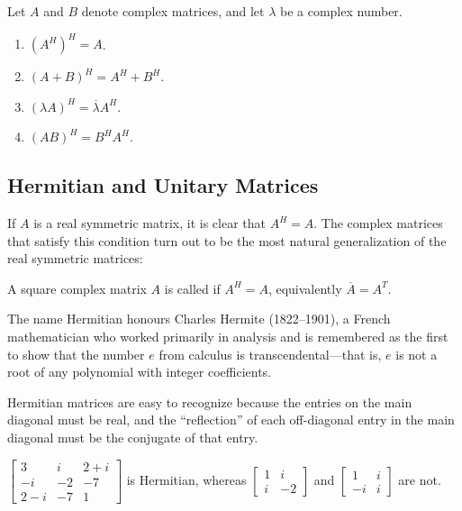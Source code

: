 \documentclass{ximera}
\begin{document}
\begin{theorem}\label{th:025659}
Let $A$ and $B$ denote complex matrices, and let $\lambda$ be a complex number.

\begin{enumerate}
\item\label{th:025659a} $(A^{H})^{H} = A$.

\item\label{th:025659b} $(A + B)^{H} = A^{H} + B^{H}$.

\item\label{th:025659c} $(\lambda A)^H = \overline{\lambda}A^H$.

\item\label{th:025659d} $(AB)^{H} = B^{H}A^{H}$.

\end{enumerate}
\end{theorem}

\subsection*{Hermitian and Unitary Matrices}


If $A$ is a real symmetric matrix, it is clear that $A^{H} = A$. The complex matrices that satisfy this condition turn out to be the
most natural generalization of the real symmetric matrices:

\begin{definition}\label{def:Hermitian}
A square complex matrix $A$ is called  if $A^{H} = A$, equivalently $\overline{A} = A^T$.
\end{definition}
\begin{remark}
The name Hermitian honours Charles Hermite (1822--1901), a French
mathematician who worked primarily in analysis and is remembered as the
first to show that the number $e$ from calculus is transcendental---that is, $e$ is not a root of any polynomial with integer coefficients.
\end{remark}

Hermitian matrices are easy to
recognize because the entries on the main diagonal must be real, and the
 ``reflection'' of each off-diagonal entry in the main diagonal must be the
 conjugate of that entry.

\begin{example}\label{ex:025690}
$\left[ \begin{array}{ccc}
3 & i & 2 + i \\
-i & -2 & -7 \\
2 - i & -7 & 1
\end{array}\right]$
 is Hermitian, whereas $\left[ \begin{array}{rr}
 1 & i \\
 i & -2
 \end{array}\right]$ and $\left[ \begin{array}{rr}
 1 & i \\
 -i & i
 \end{array}\right]$ are not.
\end{example}
\end{document}
